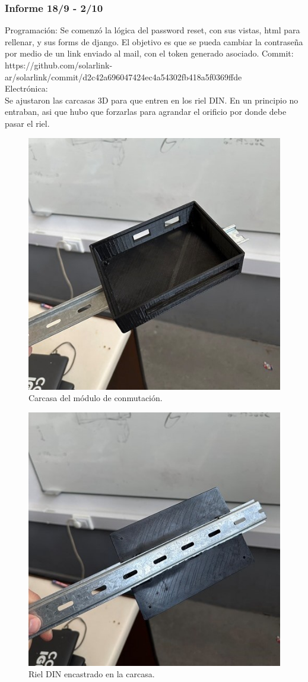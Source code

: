 \subsubsection{Informe 18/9 - 2/10}

Programación:
Se comenzó la lógica del password reset, con sus vistas, html para rellenar, y sus forms de django. El objetivo es que se pueda cambiar la contraseña por medio de un link enviado al mail, con el token generado asociado. Commit:\\
https://github.com/solarlink-\\ar/solarlink/commit/d2c42a696047424ec4a54302fb418a5f0369ffde\\

Electrónica:\\

Se ajustaron las carcasas 3D para que entren en los riel DIN. En un principio no entraban, asi que hubo que forzarlas para agrandar el orificio por donde debe pasar el riel.\\

\begin{figure}[H]
    \centering
    \includegraphics[width=0.6\linewidth]{informes/IMG_9248.jpg}
    \caption{Carcasa del módulo de conmutación.}
\end{figure}

\begin{figure}[H]
    \centering
    \includegraphics[width=0.6\linewidth]{informes/IMG_9249.jpg}
    \caption{Riel DIN encastrado en la carcasa.}
\end{figure}

